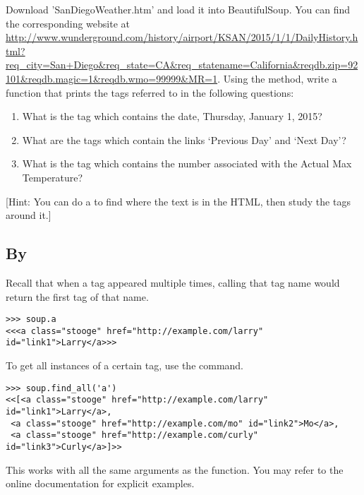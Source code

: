 \begin{problem}
Download 'SanDiegoWeather.htm' and load it into BeautifulSoup.
You can find the corresponding website at \url{http://www.wunderground.com/history/airport/KSAN/2015/1/1/DailyHistory.html?req_city=San+Diego&req_state=CA&req_statename=California&reqdb.zip=92101&reqdb.magic=1&reqdb.wmo=99999&MR=1}. Using the  method, write a function that prints the tags referred to in the following questions:
\begin{enumerate}
\item What is the tag which contains the date, Thursday, January 1, 2015?
\item What are the tags which contain the links `Previous Day' and `Next Day'?
\item What is the tag which contains the number associated with the Actual Max Temperature?
\end{enumerate}
[Hint: You can do a  to find where the text is in the HTML, then study the tags around it.]
\end{problem}

\subsection*{By }

Recall that when a tag appeared multiple times, calling that tag name would return the first tag of that name.
\begin{lstlisting}
>>> soup.a
<<<a class="stooge" href="http://example.com/larry" id="link1">Larry</a>>>
\end{lstlisting}

To get all instances of a certain tag, use the  command.
\begin{lstlisting}
>>> soup.find_all('a')
<<[<a class="stooge" href="http://example.com/larry" id="link1">Larry</a>,
 <a class="stooge" href="http://example.com/mo" id="link2">Mo</a>,
 <a class="stooge" href="http://example.com/curly" id="link3">Curly</a>]>>
\end{lstlisting}

This works with all the same arguments as the  function.
You may refer to the online documentation for explicit examples.

